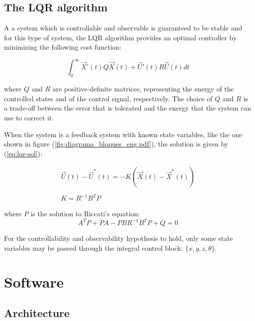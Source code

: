 \documentclass[conference]{IEEEtran}
\newcommand{\refp}[1]{(\ref{#1})}
\begin{document}
\subsection{The LQR algorithm}
\label{sec:lqr}

A a system which is controllable and observable is guaranteed to be stable and for this type of system, the LQR algorithm provides an optimal controller\cite{bib:lqrnotes} by minimizing the following cost function:

\begin{equation}
\label{eq:lqr}
\int_{0}^{\infty}  \vec{X}'(t)Q \vec{X}(t)+\vec{U}'(t)R\vec{U}(t)dt
\end{equation}

where $Q$ and $R$ are positive-definite matrices, representing the energy of the controlled states and of the control signal, respectively. The choice of $Q$ and $R$ is a trade-off between the error that is tolerated and the energy that the system can use to correct it.

 When the system is a feedback system with known state variables, like the one shown in figure \refp{fig:diagrama_bloques_eng.pdf}, the solution is given by \refp{eq:lqr-sol}:

\begin{equation}
\begin{array}{c}
\vec{U}(t)-\vec{U}^*(t) = -K(\vec{X}(t)-\vec{X}^*(t))\\
\\
K = R^{-1}B^TP
\end{array}
\label{eq:lqr-sol}
\end{equation}

where $P$ is the solution to Riccati's equation:
\begin{equation}
  \label{eq:riccati}
  A^TP + PA - PBR^{-1}B^TP + Q = 0
\end{equation}

For the controllability and observability hypothesis to hold, only some state variables may be passed through the integral control block: $\{x,y,z,\theta\}$.

\section{Software}

\subsection{Architecture}
\label{sec:software-arch}
\end{document}
